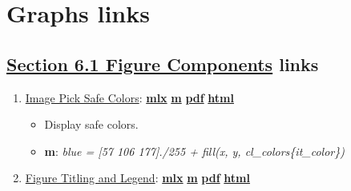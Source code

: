 \documentclass[
]{book}
\providecommand{\tightlist}{%
  \setlength{\itemsep}{0pt}\setlength{\parskip}{0pt}}
\begin{document}
\hypertarget{graphs-links}{%
\section{Graphs links}\label{graphs-links}}

\hypertarget{section-6.1-figure-componentsfigure-components-links}{%
\subsection{\texorpdfstring{\protect\hyperlink{figure-components}{Section 6.1 Figure Components} links}{Section 6.1 Figure Components links}}\label{section-6.1-figure-componentsfigure-components-links}}

\begin{enumerate}
\def\labelenumi{\arabic{enumi}.}
\tightlist
\item
  \href{https://fanwangecon.github.io/M4Econ/graph/tools/htmlpdfm/fs_color.html}{Image Pick Safe Colors}: \href{https://github.com/FanWangEcon/M4Econ/blob/master/graph/tools/fs_color.mlx}{\textbf{mlx}} \textbar{} \href{https://github.com/FanWangEcon/M4Econ/blob/master/graph/tools/htmlpdfm/fs_color.m}{\textbf{m}} \textbar{} \href{https://github.com/FanWangEcon/M4Econ/blob/master/graph/tools/htmlpdfm/fs_color.pdf}{\textbf{pdf}} \textbar{} \href{https://fanwangecon.github.io/M4Econ/graph/tools/htmlpdfm/fs_color.html}{\textbf{html}}

  \begin{itemize}
  \tightlist
  \item
    Display safe colors.
  \item
    \textbf{m}: \emph{blue = {[}57 106 177{]}./255 + fill(x, y, cl\_colors\{it\_color\})}
  \end{itemize}
\item
  \href{https://fanwangecon.github.io/M4Econ/graph/tools/htmlpdfm/fs_titling.html}{Figure Titling and Legend}: \href{https://github.com/FanWangEcon/M4Econ/blob/master/graph/tools/fs_titling.mlx}{\textbf{mlx}} \textbar{} \href{https://github.com/FanWangEcon/M4Econ/blob/master/graph/tools/htmlpdfm/fs_titling.m}{\textbf{m}} \textbar{} \href{https://github.com/FanWangEcon/M4Econ/blob/master/graph/tools/htmlpdfm/fs_titling.pdf}{\textbf{pdf}} \textbar{} \href{https://fanwangecon.github.io/M4Econ/graph/tools/htmlpdfm/fs_titling.html}{\textbf{html}}


\end{enumerate}
\end{document}
